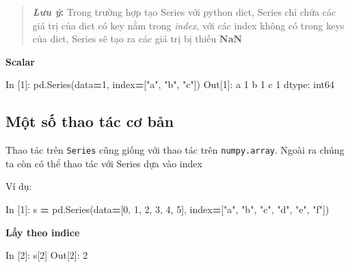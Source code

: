 \documentclass[
]{book}
\newenvironment{Shaded}{\begin{snugshade}}{\end{snugshade}}
\newcommand{\DecValTok}[1]{\textcolor[rgb]{0.00,0.00,0.81}{#1}}
\newcommand{\NormalTok}[1]{#1}
\newcommand{\OperatorTok}[1]{\textcolor[rgb]{0.81,0.36,0.00}{\textbf{#1}}}
\newcommand{\StringTok}[1]{\textcolor[rgb]{0.31,0.60,0.02}{#1}}
\begin{document}
\begin{quote}
\textbf{\emph{Lưu ý}: } Trong trường hợp tạo Series với python dict, Series chỉ chứa các giá trị của dict có key nằm trong \emph{index}, với các index không có trong keys của dict, Series sẽ tạo ra các giá trị bị thiếu \textbf{NaN}
\end{quote}

\textbf{Scalar}

\begin{Shaded}
\begin{Highlighting}[]
\NormalTok{In [}\DecValTok{1}\NormalTok{]: pd.Series(data}\OperatorTok{=}\DecValTok{1}\NormalTok{, index}\OperatorTok{=}\NormalTok{[}\StringTok{"a"}\NormalTok{, }\StringTok{"b"}\NormalTok{, }\StringTok{"c"}\NormalTok{])}
\NormalTok{Out[}\DecValTok{1}\NormalTok{]: }
\NormalTok{a    }\DecValTok{1}
\NormalTok{b    }\DecValTok{1}
\NormalTok{c    }\DecValTok{1}
\NormalTok{dtype: int64}
\end{Highlighting}
\end{Shaded}

\hypertarget{mux1ed9t-sux1ed1-thao-tuxe1c-cux1a1-bux1ea3n}{%
\subsection*{Một số thao tác cơ bản}\label{mux1ed9t-sux1ed1-thao-tuxe1c-cux1a1-bux1ea3n}}

Thao tác trên \texttt{Series} cũng giống với thao tác trên \texttt{numpy.array}. Ngoài ra chúng ta còn có thể thao tác với Series dựa vào index

Ví dụ:

\begin{Shaded}
\begin{Highlighting}[]
\NormalTok{In [}\DecValTok{1}\NormalTok{]: s }\OperatorTok{=}\NormalTok{ pd.Series(data}\OperatorTok{=}\NormalTok{[}\DecValTok{0}\NormalTok{, }\DecValTok{1}\NormalTok{, }\DecValTok{2}\NormalTok{, }\DecValTok{3}\NormalTok{, }\DecValTok{4}\NormalTok{, }\DecValTok{5}\NormalTok{], index}\OperatorTok{=}\NormalTok{[}\StringTok{"a"}\NormalTok{, }\StringTok{"b"}\NormalTok{, }\StringTok{"c"}\NormalTok{, }\StringTok{"d"}\NormalTok{, }\StringTok{"e"}\NormalTok{, }\StringTok{"f"}\NormalTok{])}
\end{Highlighting}
\end{Shaded}

\textbf{Lấy theo indice}

\begin{Shaded}
\begin{Highlighting}[]
\NormalTok{In [}\DecValTok{2}\NormalTok{]: s[}\DecValTok{2}\NormalTok{]}
\NormalTok{Out[}\DecValTok{2}\NormalTok{]: }\DecValTok{2}
\end{Highlighting}
\end{Shaded}
\end{document}
